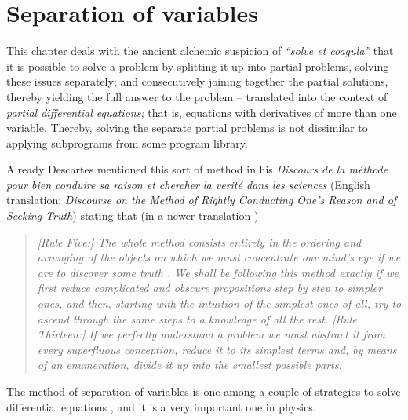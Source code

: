 \chapter{Separation of variables}
\label{2011-m-ch-sv}

This chapter deals with the ancient alchemic suspicion of {\it ``solve et coagula''} that it is possible
to solve a problem by splitting it up into partial problems, solving these issues separately; and
consecutively joining together the partial solutions, thereby yielding the full answer to the problem
-- translated into the context of {\em partial differential equations;}
that is, equations with derivatives of more than one variable.
Thereby, solving the separate partial problems is not dissimilar to
applying subprograms from some program library.

Already Descartes mentioned this sort of method in his
{\it Discours de la m{\'e}thode pour bien conduire sa raison et chercher la verit{\'e} dans les sciences}
(English translation: {\em Discourse on the Method of Rightly Conducting One's Reason and of Seeking Truth})
\cite{Descartes-Discourse} stating that (in a newer translation \cite{Descartes-CW1})
\begin{quote}
{\em
[Rule Five:]
The whole method consists entirely in the ordering and arranging of the
objects on which we must concentrate our mind's eye if we are to
discover some truth . We shall be following this method exactly if we first
reduce complicated and obscure propositions step by step to simpler
ones, and then, starting with the intuition of the simplest ones of all, try
to ascend through the same steps to a knowledge of all the rest.
[Rule Thirteen:]
If we perfectly understand a problem we must abstract it from every
superfluous conception, reduce it to its simplest terms and, by means of
an enumeration, divide it up into the smallest possible parts.
}
\end{quote}

The method of
separation of variables
is one among a couple of strategies to solve differential equations
\cite{Evans98,jaenich-an},
and it is a very important one in physics.

